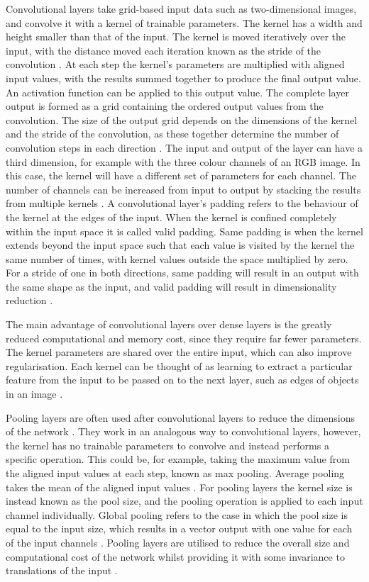 \documentclass[12pt]{article}
\begin{document}
Convolutional layers take grid-based input data such as two-dimensional images, and convolve it with a kernel of trainable parameters. The kernel has a width and height smaller than that of the input. The kernel is moved iteratively over the input, with the distance moved each iteration known as the stride of the convolution \cite{Aghdam17}. At each step the kernel's parameters are multiplied with aligned input values, with the results summed together to produce the final output value. An activation function can be applied to this output value. The complete layer output is formed as a grid containing the ordered output values from the convolution. The size of the output grid depends on the dimensions of the kernel and the stride of the convolution, as these together determine the number of convolution steps in each direction \cite{Aghdam17}. The input and output of the layer can have a third dimension, for example with the three colour channels of an RGB image. In this case, the kernel will have a different set of parameters for each channel. The number of channels can be increased from input to output by stacking the results from multiple kernels \cite{Aghdam17}. A convolutional layer's padding refers to the behaviour of the kernel at the edges of the input. When the kernel is confined completely within the input space it is called valid padding. Same padding is when the kernel extends beyond the input space such that each value is visited by the kernel the same number of times, with kernel values outside the space multiplied by zero. For a stride of one in both directions, same padding will result in an output with the same shape as the input, and valid padding will result in dimensionality reduction \cite{Goodfellow16, Aghdam17}.

The main advantage of convolutional layers over dense layers is the greatly reduced computational and memory cost, since they require far fewer parameters. The kernel parameters are shared over the entire input, which can also improve regularisation. Each kernel can be thought of as learning to extract a particular feature from the input to be passed on to the next layer, such as edges of objects in an image \cite{Goodfellow16}.

Pooling layers are often used after convolutional layers to reduce the dimensions of the network \cite{Goodfellow16}. They work in an analogous way to convolutional layers, however, the kernel has no trainable parameters to convolve and instead performs a specific operation. This could be, for example, taking the maximum value from the aligned input values at each step, known as max pooling. Average pooling takes the mean of the aligned input values \cite{Aghdam17}. For pooling layers the kernel size is instead known as the pool size, and the pooling operation is applied to each input channel individually. Global pooling refers to the case in which the pool size is equal to the input size, which results in a vector output with one value for each of the input channels \cite{Aghdam17}. Pooling layers are utilised to reduce the overall size and computational cost of the network whilst providing it with some invariance to translations of the input \cite{Goodfellow16, Aghdam17}.
\end{document}
